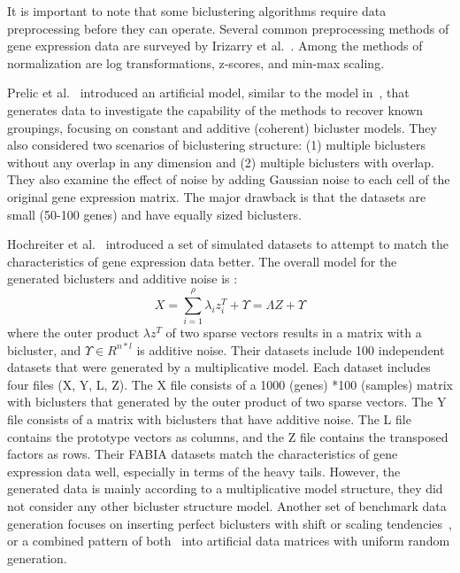 It is important to note that some biclustering algorithms require data preprocessing before they can operate.
Several common preprocessing methods of gene expression data are surveyed by Irizarry et al.~\cite{irizarry2003exploration}.
Among the methods of normalization are log transformations, z-scores, and min-max scaling.

Prelic et al.~\cite{prelic2006systematic} introduced an artificial model, similar to the model in~\cite{ihmels2002revealing}, that generates data to investigate the capability of the methods to recover known groupings, focusing on constant and additive (coherent) bicluster models.
They also considered two scenarios of biclustering structure: (1) multiple biclusters without any overlap in any dimension and (2) multiple biclusters with overlap.
They also examine the effect of noise by adding Gaussian noise to each cell of the original gene expression matrix.
The major drawback is that the datasets are small (50-100 genes) and have equally sized biclusters.

Hochreiter et al.~\cite{hochreiter2010fabia} introduced a set of simulated datasets to attempt to match the characteristics of gene expression data better. The overall model for the generated  biclusters and additive noise is :
\begin{equation}
	X =  \sum_{i=1}^{\rho }\lambda_{i} z_{i}^{T} +\Upsilon  =\Lambda Z +\Upsilon 
\end{equation}
where the outer product $\lambda z_{}^{T}$ of two sparse vectors results in a matrix with a bicluster, and $\Upsilon \in R^{n*l}$ is additive noise. Their datasets include 100 independent datasets that were generated by a multiplicative model. Each dataset includes four files (X, Y, L, Z). The X file consists of a 1000 (genes) *100 (samples) matrix with biclusters that generated by the outer product of two sparse vectors. The Y file consists of a matrix with biclusters that have additive noise. The L file contains the prototype vectors as columns, and the Z file contains the transposed factors as rows. Their FABIA datasets match the characteristics of gene expression data well, especially in terms of the heavy tails. However, the generated data is mainly according to a multiplicative model structure, they did not consider any other bicluster structure model. %
Another set of benchmark data generation focuses on inserting perfect biclusters with shift or scaling tendencies~\cite{mukhopadhyay2010biclustering}, or a combined pattern of both~\cite{pontes2013configurable} into artificial data matrices with uniform random generation.


